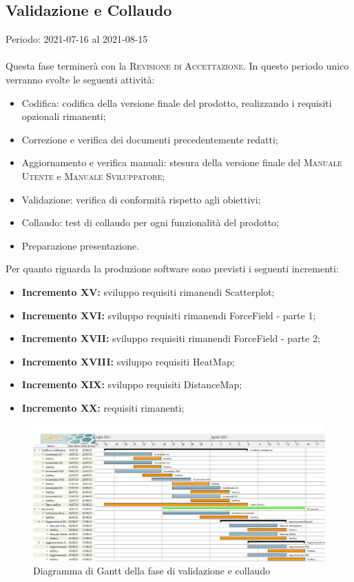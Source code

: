 \documentclass[../piano_di_progetto.tex]{subfiles}
\begin{document}

\subsection{Validazione e Collaudo}%
\label{sub:valid_coll}
Periodo: 2021-07-16 al 2021-08-15 \\ \\ 
Questa fase terminerà con la \textsc{Revisione di Accettazione}. In questo periodo unico verranno svolte le seguenti attività:

\begin{itemize}
    \item Codifica: codifica della versione finale del prodotto, realizzando i requisiti opzionali rimanenti;
    \item Correzione e verifica dei documenti precedentemente redatti;
    \item Aggiornamento e verifica manuali: stesura della versione finale del \textsc{Manuale Utente} e \textsc{Manuale Sviluppatore};
    \item Validazione: verifica di conformità rispetto agli obiettivi;
    \item Collaudo: test di collaudo per ogni funzionalità del prodotto;
    \item Preparazione presentazione.
\end{itemize}

Per quanto riguarda la produzione software sono previsti i seguenti incrementi:
\begin{itemize}
    \item \textbf{Incremento XV:} sviluppo requisiti rimanendi Scatterplot;
    \item \textbf{Incremento XVI:} sviluppo requisiti rimanendi ForceField - parte 1;
    \item \textbf{Incremento XVII:} sviluppo requisiti rimanendi ForceField - parte 2;
    \item \textbf{Incremento XVIII:} sviluppo requisiti HeatMap;
    \item \textbf{Incremento XIX:} sviluppo requisiti DistanceMap;
    \item \textbf{Incremento XX:} requisiti rimanenti;
\end{itemize}


\begin{figure}[H]
\centering
\includegraphics[width=18cm]{src/img/gantt/pianif_RA.jpg}
\caption{Diagramma di Gantt della fase di validazione e collaudo}
\end{figure}
\end{document}
